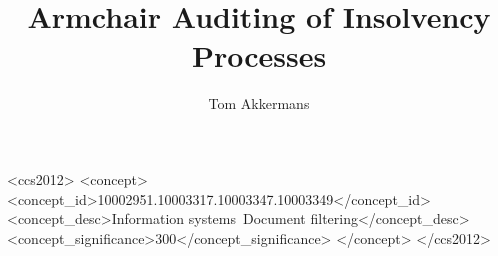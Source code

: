 \documentclass[sigconf]{acmart}
\title{Armchair Auditing of Insolvency Processes}
\author{Tom Akkermans}
\affiliation{\institution{University of Amsterdam}}
\begin{document}



%
%
\begin{CCSXML}
<ccs2012>
	<concept>
		<concept_id>10002951.10003317.10003347.10003349</concept_id>
		<concept_desc>Information systems~Document filtering</concept_desc>
		<concept_significance>300</concept_significance>
	</concept>
</ccs2012>
\end{CCSXML}


\maketitle 





  

\end{document}
